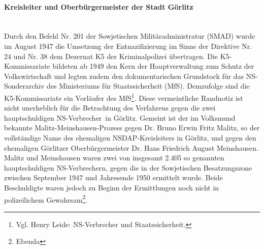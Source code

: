 \paragraph{Kreisleiter und Oberbürgermeister der Stadt Görlitz}~\\
Durch den Befehl Nr. 201 der Sowjetischen Militäradministratur (SMAD) wurde im August 1947 die Umsetzung der Entnazifizierung im Sinne der Direktive Nr. 24 und Nr. 38 dem Dezernat K5 der Kriminalpolizei übertragen. Die K5-Kommissariate bildeten ab 1949 den Kern der Hauptverwaltung zum Schutz der Volkswirtschaft und legten zudem den dokumentarischen Grundstock für das NS-Sonderarchiv des Ministeriums für Staatssicherheit (MfS). Demzufolge sind die K5-Kommissariate ein Vorläufer des MfS\footnote{Vgl. Henry Leide: NS-Verbrecher und Staatssicherheit.}. Diese vermeintliche Randnotiz ist nicht unerheblich für die Betrachtung des Verfahrens gegen die zwei \glqq hauptschuldigen NS-Verbrecher\grqq~in Görlitz. Gemeint ist der im Volksmund bekannte Malitz-Meinshausen-Prozess gegen Dr. Bruno Erwin Fritz Malitz, so der vollständige Name des ehemaligen NSDAP-Kreisleiters in Görlitz, und gegen den ehemaligen Görlitzer Oberbürgermeister Dr. Hans Friedrich August Meinshausen. Malitz und Meinshausen waren zwei von insgesamt 2.405 so genannten hauptschuldigen NS-Verbrechern, gegen die in der Sowjetischen Besatzungszone zwischen September 1947 und Jahresende 1950 ermittelt wurde. Beide Beschuldigte waren jedoch zu Beginn der Ermittlungen noch nicht in polizeilichem Gewahrsam\footnote{Ebenda}.


